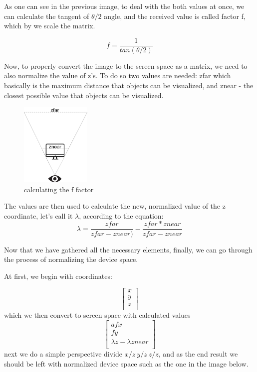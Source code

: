  As one can see in the previous image, to deal with the both values at once, we can calculate the tangent of $\theta/2$ angle, and the received value is called factor f, which by we scale the matrix.

\begin{equation}
f=\frac{1}{tan(\theta / 2)}
\label{fequation}
\end{equation} 

Now, to properly convert the image to the screen space as a matrix, we need to also normalize the value of z's. To do so two values are needed: zfar which basically is the maximum distance that objects can be visualized, and znear - the closest possible value that objects can be visualized. 

\begin{figure}[H]
  \begin{center}
  \includegraphics[width=0.3\textwidth]{figures/normalizing_z.png}  
  \end{center}
  \caption{calculating the f factor}
\end{figure}

The values are then used to calculate the new, normalized value of the z coordinate, let's call it $\lambda$, according to the equation:
\begin{equation}
\lambda=\frac{zfar}{zfar - znear)}
-
\frac{zfar * znear}{zfar-znear}
\label{zequation}
\end{equation} 

Now that we have gathered all the necessary elements, finally, we can go through the process of normalizing the device space.

At first, we begin with coordinates:

\[
\begin{bmatrix}
x\\
y\\
z\\
\end{bmatrix}
\]
which we then convert to screen space with calculated values 
\[
\begin{bmatrix}
afx\\
fy\\
\lambda z-\lambda znear\\
\end{bmatrix}
\]
next we do a simple perspective divide $x/z\ y/z\ z/z$, and as the end result we should be left with normalized device space such as the one in the image below.


